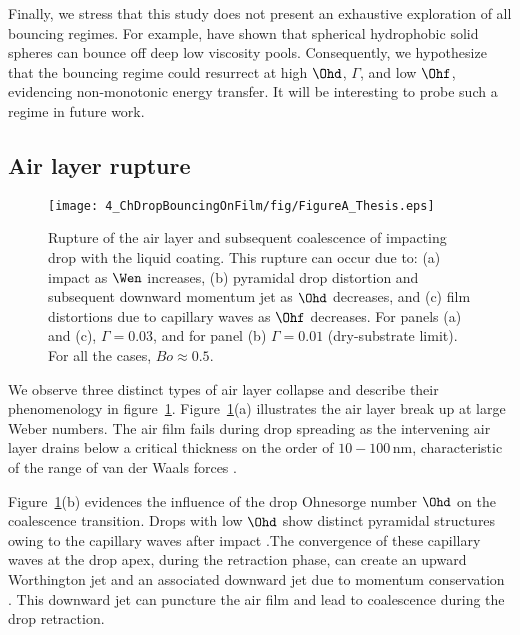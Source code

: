 Finally, we stress that this study does not present an exhaustive exploration of all bouncing regimes. For example, \citet{galeano2021capillary} have shown that spherical hydrophobic solid spheres can bounce off deep low viscosity pools. Consequently, we hypothesize that the bouncing regime could resurrect at high $\Ohd$, $\Gamma$, and low $\Ohf$, evidencing non-monotonic energy transfer. It will be interesting to probe such a regime in future work.


\begin{subappendices}
	\section{Air layer rupture}
	\label{App:FilmRupture}
	
	\begin{figure}
		\centering
		\texttt{[image: 4\_ChDropBouncingOnFilm/fig/FigureA\_Thesis.eps]}
		\caption{Rupture of the air layer and subsequent coalescence of impacting drop with the liquid coating. This rupture can occur due to: (a) impact as $\Wen$ increases, (b) pyramidal drop distortion and subsequent downward momentum jet as $\Ohd$ decreases, and (c) film distortions due to capillary waves as $\Ohf$ decreases. For panels (a) and (c), $\Gamma = 0.03$, and for panel (b) $\Gamma = 0.01$ (dry-substrate limit). For all the cases, $Bo \approx 0.5$.}
		\label{fig:figureA1}
	\end{figure}
	
	We observe three distinct types of air layer collapse and describe their phenomenology in figure~\ref{fig:figureA1}. 
	Figure~\ref{fig:figureA1}(a) illustrates the air layer break up at large Weber numbers. The air film fails during drop spreading as the intervening air layer drains below a critical thickness on the order of $10 - 100\,\si{\nano\meter}$, characteristic of the range of van der Waals forces \citep{charles1960coalescence, SprittlesPhysRevLett.124.084501, zhang2021thin}.
	
	Figure~\ref{fig:figureA1}(b) evidences the influence of the drop Ohnesorge number $\Ohd$ on the coalescence transition. Drops with low $\Ohd$ show distinct pyramidal structures owing to the capillary waves after impact \citep{renardy2003pyramidal}.The convergence of these capillary waves at the drop apex, during the retraction phase, can create an upward Worthington jet and an associated downward jet due to momentum conservation \citep{bartolo2006singular,lee2020downward,zhang2022impact}. This downward jet can puncture the air film and lead to coalescence during the drop retraction. 
	

\end{subappendices}
